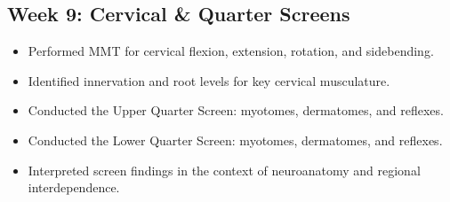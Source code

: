 \subsection*{Week 9: Cervical \& Quarter Screens}

\begin{itemize}
  \item [$\square$] Performed MMT for cervical flexion, extension, rotation, and sidebending.
  \item [$\square$] Identified innervation and root levels for key cervical musculature.
  \item [$\square$] Conducted the Upper Quarter Screen: myotomes, dermatomes, and reflexes.
  \item [$\square$] Conducted the Lower Quarter Screen: myotomes, dermatomes, and reflexes.
  \item [$\square$] Interpreted screen findings in the context of neuroanatomy and regional interdependence.
\end{itemize}
